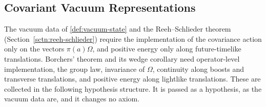 \subsection{Covariant Vacuum Representations}\label{sbsctn:covariant-vacuum-representations}

The vacuum data of \ref{def:vacuum-state} and the Reeh--Schlieder theorem (Section~\ref{sctn:reeh-schlieder}) require the implementation of the covariance action only on the vectors $\pi(a)\Omega$, and positive energy only along future-timelike translations. Borchers' theorem and its wedge corollary need operator-level implementation, the group law, invariance of $\Omega$, continuity along boosts and transverse translations, and positive energy along lightlike translations. These are collected in the following hypothesis structure. It is passed as a hypothesis, as the vacuum data are, and it changes no axiom.

